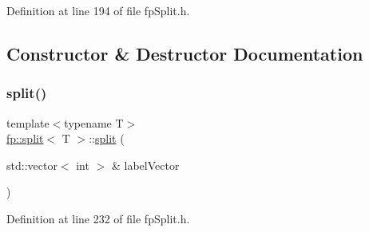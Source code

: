 Definition at line 194 of file fp\+Split.\+h.



\subsection{Constructor \& Destructor Documentation}
\mbox{\label{classfp_1_1split_aa4634b2460fcbe77440805d0526e72b6}} 
\subsubsection{\texorpdfstring{split()}{split()}}
{\footnotesize\ttfamily template$<$typename T$>$ \\
\hyperlink{classfp_1_1split}{fp\+::split}$<$ T $>$\+::\hyperlink{classfp_1_1split}{split} (\begin{DoxyParamCaption}\item[{std\+::vector$<$ int $>$ \&}]{label\+Vector }\end{DoxyParamCaption})\hspace{0.3cm}{\ttfamily [inline]}}



Definition at line 232 of file fp\+Split.\+h.



